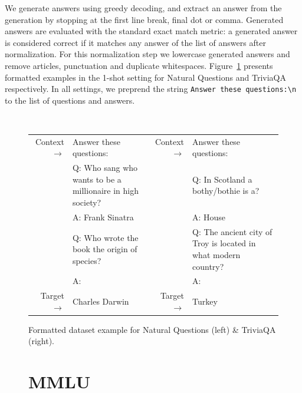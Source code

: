 \documentclass[11pt]{article}
\begin{document}
We generate answers using greedy decoding, and extract an answer from the generation by stopping at the first line break, final dot or comma.
Generated answers are evaluated with the standard exact match metric:
a generated answer is considered correct if it matches any answer of the list of answers after normalization.
For this normalization step we lowercase generated answers and remove articles, punctuation and duplicate whitespaces.
Figure~\ref{fig:qa} presents formatted examples in the 1-shot setting for Natural Questions and TriviaQA respectively.
In all settings, we preprend the string {\tt Answer these questions:\textbackslash n} to the list of questions and answers.

\begin{figure}[h]
{ \tt \tiny
\begin{tabularx}{\linewidth}{r@{\ }X|r@{\ }X} 
\toprule 
Context $\to$ &Answer these questions: & Context $\to$ &Answer these questions: \\
&Q: Who sang who wants to be a millionaire in high society? &&Q: In Scotland a bothy/bothie is a?\\
&A: Frank Sinatra & & A: House\\
&Q: Who wrote the book the origin of species?&&Q: The ancient city of Troy is located in what modern country? \\
&A: && A:\\
\midrule 
Target  $\to$ &Charles Darwin & Target $\to$ & Turkey\\
\bottomrule 
\end{tabularx}}
\caption{Formatted dataset example for Natural Questions (left) \& TriviaQA (right).}  
\label{fig:qa}  
\end{figure}


\clearpage
\begin{figure}
\section{MMLU}
\end{figure}
\end{document}
